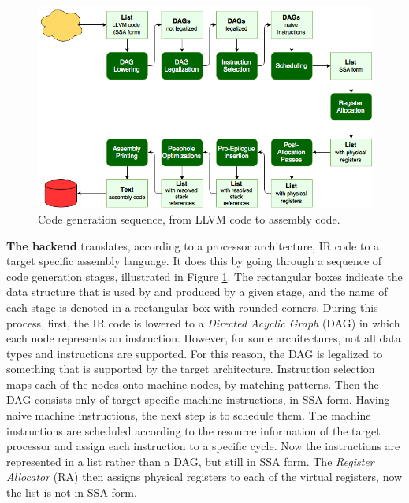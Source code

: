 \begin{figure}[b!]
\centering
\includegraphics[width=\textwidth]{figures/code_generation_sequence}%
\caption{Code generation sequence, from LLVM code to assembly code.}
\label{fig:code_generation}
\end{figure}

\textbf{The backend} translates, according to a processor architecture, IR code to a target specific assembly language. It does this by going through a sequence of code generation stages, illustrated in Figure \ref{fig:code_generation}. The rectangular boxes indicate the data structure that is used by and produced by a given stage, and the name of each stage is denoted in a rectangular box with rounded corners. During this process, first, the IR code is lowered to a \emph{Directed Acyclic Graph} (DAG) in which each node represents an instruction. However, for some architectures, not all data types and instructions are supported. For this reason, the DAG is legalized to something that is supported by the target architecture. Instruction selection maps each of the nodes onto machine nodes, by matching patterns. %
Then the DAG consists only of target specific machine instructions, in SSA form. Having naive machine instructions, the next step is to schedule them. The machine instructions are scheduled according to the resource information of the target processor and assign each instruction to a specific cycle. 
Now the instructions are represented in a list rather than a DAG, but still in SSA form. The \emph{Register Allocator} (RA) then assigns physical registers to each of the virtual registers, now the list is not in SSA form. 

